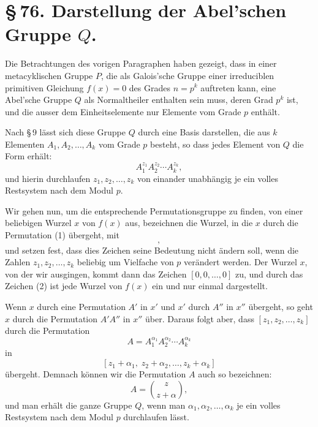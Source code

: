 \documentclass[11pt]{article}
\begin{document}
\section*{\S\,76. Darstellung der Abel'schen Gruppe $Q$.}

Die Betrachtungen des vorigen Paragraphen haben gezeigt, dass in einer metacyklischen Gruppe $P$, die als Galois'sche Gruppe einer irreduciblen primitiven Gleichung $f(x)=0$ des Grades $n=p^k$ auftreten kann, eine Abel'sche Gruppe $Q$ als Normaltheiler enthalten sein muss, deren Grad $p^k$ ist, und die ausser dem Einheitselemente nur Elemente vom Grade $p$ enthält.

Nach \S\,9 lässt sich diese Gruppe $Q$ durch eine Basis darstellen, die aus $k$ Elementen $A_1,A_2,\ldots,A_k$ vom Grade $p$ besteht, so dass jedes Element von $Q$ die Form erhält:
\begin{equation}
 A_1^{z_1}A_2^{z_2}\cdots A_k^{z_k},
 \tag{1}
\end{equation}
und hierin durchlaufen $z_1,z_2,\ldots,z_k$ von einander unabhängig je ein volles Restsystem nach dem Modul $p$.

Wir gehen nun, um die entsprechende Permutationsgruppe zu finden, von einer beliebigen Wurzel $x$ von $f(x)$ aus, bezeichnen die Wurzel, in die $x$ durch die Permutation (1) übergeht, mit
\begin{equation}
 [z_1,z_2,\ldots,z_k],
 \tag{2}
\end{equation}
und setzen fest, dass dies Zeichen seine Bedeutung nicht ändern soll, wenn die Zahlen $z_1,z_2,\ldots,z_k$ beliebig um Vielfache von $p$ verändert werden. Der Wurzel $x$, von der wir ausgingen, kommt dann das Zeichen $[0,0,\ldots,0]$ zu, und durch das Zeichen (2) ist jede Wurzel von $f(x)$ ein und nur einmal dargestellt.

Wenn $x$ durch eine Permutation $A'$ in $x'$ und $x'$ durch $A''$ in $x''$ übergeht, so geht $x$ durch die Permutation $A'A''$ in $x''$ über. Daraus folgt aber, dass $[z_1,z_2,\ldots,z_k]$ durch die Permutation
\begin{equation}
 A=A_1^{\alpha_1}A_2^{\alpha_2}\cdots A_k^{\alpha_k}
 \tag{3}
\end{equation}
in
\[
 [z_1+\alpha_1,\;z_2+\alpha_2,\ldots,z_k+\alpha_k]
\]
übergeht. Demnach können wir die Permutation $A$ auch so bezeichnen:
\begin{equation}
 A=\binom{z}{z+\alpha},
 \tag{4}
\end{equation}
und man erhält die ganze Gruppe $Q$, wenn man $\alpha_1,\alpha_2,\ldots,\alpha_k$ je ein volles Restsystem nach dem Modul $p$ durchlaufen lässt.
\end{document}

